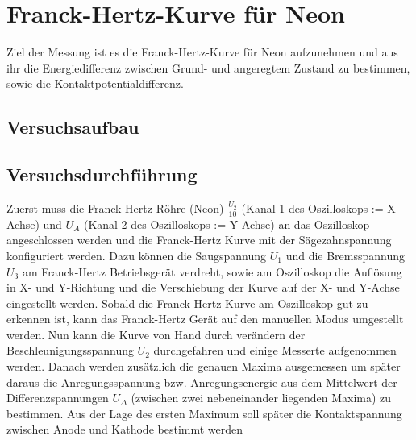 \documentclass[12pt,a4paper]{article}
\begin{document}
\section{Franck-Hertz-Kurve für Neon}
Ziel der Messung ist es die Franck-Hertz-Kurve für Neon aufzunehmen und aus ihr die Energiedifferenz zwischen Grund- und angeregtem Zustand zu bestimmen, sowie die Kontaktpotentialdifferenz.

\subsection{Versuchsaufbau}
\subsection{Versuchsdurchführung}
Zuerst muss die Franck-Hertz Röhre (Neon) $\frac{U_2}{10}$ (Kanal 1 des Oszilloskops := X-Achse) und $U_A$ (Kanal 2 des Oszilloskops := Y-Achse) an das Oszilloskop angeschlossen werden und die Franck-Hertz Kurve mit der Sägezahnspannung konfiguriert werden. Dazu können die Saugspannung $U_1$ und die Bremsspannung $U_3$ am Franck-Hertz Betriebsgerät verdreht, sowie
am Oszilloskop die Auflösung in X- und Y-Richtung und die Verschiebung der Kurve auf der X- und Y-Achse eingestellt werden.
Sobald die Franck-Hertz Kurve am Oszilloskop gut zu erkennen ist, kann das Franck-Hertz Gerät auf den manuellen Modus umgestellt werden. Nun kann die Kurve von Hand durch verändern der Beschleunigungsspannung $U_2$ durchgefahren und einige Messerte aufgenommen werden. Danach werden zusätzlich die genauen Maxima ausgemessen um später daraus die Anregungsspannung bzw. Anregungsenergie aus dem Mittelwert der Differenzspannungen $U_{\Delta}$ (zwischen zwei nebeneinander liegenden Maxima) zu bestimmen.
Aus der Lage des ersten Maximum soll später die Kontaktspannung zwischen Anode und Kathode bestimmt werden
\end{document}
